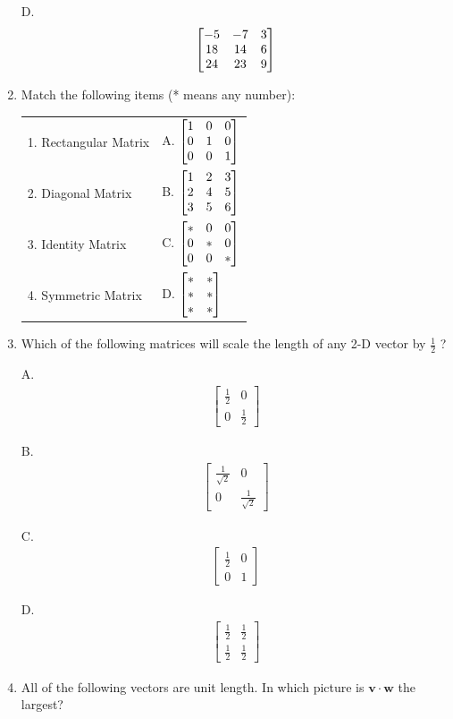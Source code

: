 \begin{enumerate}
  D.\vspace{-2em} \begin{align*}
  \begin{bmatrix} -5 & -7 & 3 \\ 18 & 14 & 6 \\ 24 & 23 & 9 \end{bmatrix}
  \end{align*}

\item Match the following items (* means any number):

\begin{tabular}{ll}
1. Rectangular Matrix & A. $\begin{bmatrix} 1 & 0 & 0 \\ 0 & 1 & 0 \\ 0 & 0 & 1 \end{bmatrix}$ \\
2. Diagonal Matrix & B. $\begin{bmatrix} 1 & 2 & 3 \\ 2 & 4 & 5 \\ 3 & 5 & 6 \end{bmatrix}$ \\
3. Identity Matrix & C. $\begin{bmatrix} * & 0 & 0 \\ 0 & * & 0 \\ 0 & 0 & * \end{bmatrix}$ \\
4. Symmetric Matrix & D. $\begin{bmatrix} * & * \\ * & * \\ * & * \end{bmatrix}$
\end{tabular}

\item Which of the following matrices will scale the length of any 2-D vector by $\frac12$ ?

A. \begin{align*}
\begin{bmatrix} \frac12 & 0 \\ 0 & \frac12 \end{bmatrix}
    \end{align*}

B. \begin{align*}
\begin{bmatrix} \frac{1}{\sqrt{2}} & 0 \\ 0 & \frac{1}{\sqrt{2}}  \end{bmatrix}
    \end{align*}

C. \begin{align*}
\begin{bmatrix} \frac{1}{2} & 0 \\ 0 &  1 \end{bmatrix}
    \end{align*}

D. \begin{align*}
\begin{bmatrix}\frac{1}{2} & \frac12 \\ \frac12 & \frac12\end{bmatrix}
    \end{align*}

\item All of the following vectors are unit length. In which picture is $\mathbf{v}\cdot\mathbf{w}$ the largest?


\end{enumerate}
